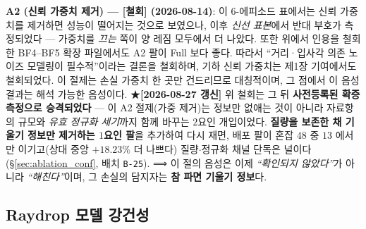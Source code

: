 \documentclass[11pt]{report}
\numberwithin{equation}{chapter}
\numberwithin{figure}{chapter}
\numberwithin{table}{chapter}
\begin{document}
\textbf{A2 (신뢰 가중치 제거) --- [철회] (2026-08-14)}:
이 6-에피소드 표에서는 신뢰 가중치를 제거하면 성능이 떨어지는 것으로 보였으나,
이후 \emph{신선 표본}에서 반대 부호가 측정되었다 --- 가중치를 \emph{끄는} 쪽이
양 레짐 모두에서 더 나았다. 또한 위에서 인용을 철회한 BF4--BF5 확장 파일에서도
A2 팔이 Full 보다 좋다. 따라서 ``거리·입사각 의존 노이즈 모델링이 필수적''이라는
결론을 철회하며, 기하 신뢰 가중치는 제1장 기여에서도 철회되었다.
이 절제는 손실 가중치 한 곳만 건드리므로 대칭적이며, 그 점에서 이 음성 결과는
해석 가능한 음성이다.
★\textbf{[2026-08-27 갱신]} 위 철회는 그 뒤 \textbf{사전등록된 확증 측정으로
승격되었다} --- 이 A2 절제(가중 제거)는 정보만 없애는 것이 아니라 자료항의 규모와
\emph{유효 정규화 세기}까지 함께 바꾸는 $2$요인 개입이었다. \textbf{질량을 보존한 채
기울기 정보만 제거하는 $1$요인 팔}을 추가하여 다시 재면, 배포 팔이 혼잡 $48$ 중 $13$
에서만 이기고(상대 중앙 $+18.23\%$ 더 나쁘다) 질량$\cdot$정규화 채널 단독은 널이다
(\S\ref{sec:ablation_conf}, 배치 \texttt{B-25}). ⟹ 이 절의 음성은 이제
\emph{``확인되지 않았다''}가 아니라 \emph{``해친다''}이며, 그 손실의 담지자는
\textbf{참 파면 기울기 정보}다.

\subsection{Raydrop 모델 강건성}
\label{sec:raydrop}
\end{document}
